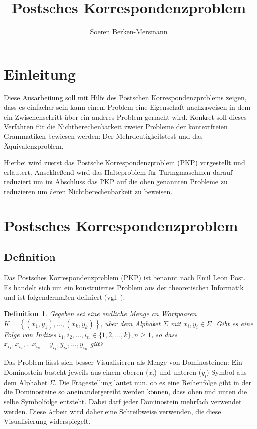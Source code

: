 \documentclass[]{scrartcl}
\title{Postsches Korrespondenzproblem}
\author{Soeren Berken-Mersmann}
\newtheorem{definition}{Definition}[section]
\begin{document}
\maketitle

\section{Einleitung}

	Diese Ausarbeitung soll mit Hilfe des Postschen Korrespondenzproblems zeigen, dass es einfacher sein kann einem Problem eine Eigenschaft nachzuweisen in dem ein Zwischenschritt über ein anderes Problem gemacht wird. Konkret soll dieses Verfahren für die Nichtberechenbarkeit zweier Probleme der kontextfreien Grammatiken bewiesen werden: Der Mehrdeutigkeitstest und das Äquivalenzproblem.
	
	Hierbei wird zuerst das Postsche Korrespondenzproblem (PKP) vorgestellt und erläutert. Anschließend wird das Halteproblem für Turingmaschinen darauf reduziert um im Abschluss das PKP auf die oben genannten Probleme zu reduzieren um deren Nichtberechenbarkeit zu beweisen.

\section{Postsches Korrespondenzproblem}

	\subsection{Definition}
	
		Das Postsches Korrespondenzproblem (PKP) ist benannt nach Emil Leon Post. Es handelt sich um ein konstruiertes Problem aus der theoretischen Informatik und ist folgendermaßen definiert (vgl. \cite{wegener}):
		
		\begin{definition}
			Gegeben sei eine endliche Menge an Wortpaaren $K = \left\lbrace (x_1, y_1), ..., (x_k, y_k)\right\rbrace $, über dem Alphabet $\Sigma$ mit $x_i, y_i \in \Sigma$. Gibt es eine Folge von Indizes $i_1, i_2, ..., i_n \in \{1, 2, ..., k\}, n \geq 1$, so dass $x_{i_1},x_{i_2}, ... x_{i_n} = y_{i_1}, y_{i_2}, ..., y_{i_n}$ gilt?
		\end{definition}
		
		Das Problem lässt sich besser Visualisieren als Menge von Dominosteinen: Ein Dominostein besteht jeweils aus einem oberen ($x_i$) und unteren ($y_i$) Symbol aus dem Alphabet $\Sigma$. Die Fragestellung lautet nun, ob es eine Reihenfolge gibt in der die Dominosteine so aneinandergereiht werden können, dass oben und unten die selbe Symbolfolge entsteht. Dabei darf jeder Dominostein mehrfach verwendet werden. Diese Arbeit wird daher eine Schreibweise verwenden, die diese Visualisierung widerspiegelt.
	
\end{document}
